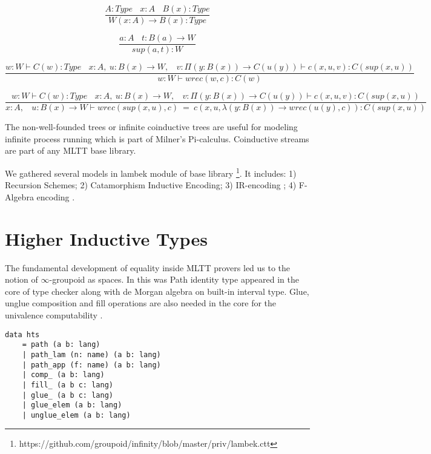\documentclass{aip-cp}
\begin{document}
\begin{equation}
\tag{$W$-formation}
\dfrac
{A:Type\ \ \ \ x:A\ \ \ \ B(x):Type}
{W (x:A) \rightarrow B(x) : Type}
\end{equation}

\begin{equation}
\tag{$W$-intro}
\dfrac
{a:A\ \ \ \ t: B(a) \rightarrow W}
{sup(a,t) : W}
\end{equation}

\begin{equation}
\tag{$W$-elimination}
\dfrac
{w: W \vdash C(w) : Type\ \ \ \ x:A,\ u:B(x) \rightarrow W,\ \ \ \ v:\Pi (y:B(x)) \rightarrow C(u(y)) \vdash c(x,u,v):C(sup(x,u))}
{w:W \vdash wrec(w,c):C(w)}
\end{equation}

\begin{equation}
\tag{$W$-computation}
\dfrac
{w: W \vdash C(w) : Type\ \ \ \ x:A,\ u:B(x) \rightarrow W,\ \ \ \ v:\Pi (y:B(x)) \rightarrow C(u(y)) \vdash c(x,u,v):C(sup(x,u))}
{x:A,\ \ \ \ u:B(x) \rightarrow W \vdash wrec(sup(x,u),c)\ =\ c(x,u,\lambda (y:B(x)) \rightarrow wrec(u(y),c)):C(sup(x,u))}
\end{equation}

The non-well-founded trees or infinite coinductive trees \cite{Jacobs97,Basold16}
are useful for modeling infinite process running which is
part of Milner's Pi-calculus. Coinductive streams are
part of any MLTT base library.

We gathered several models in lambek module of base library \footnote{https://github.com/groupoid/infinity/blob/master/priv/lambek.ctt}.
It includes:
1) Recursion Schemes;
2) Catamorphism Inductive Encoding;
3) IR-encoding \cite{Dagand13};
4) F-Algebra encoding  \cite{Hinze13}.

\section{Higher Inductive Types}

The fundamental development of equality inside MLTT
provers led us to the notion of $\infty$-groupoid \cite{Streicher95} as spaces.
In this was Path identity type appeared in the core
of type checker along with de Morgan algebra on
built-in interval type. Glue, unglue composition
and fill operations are also needed in the core
for the univalence computability \cite{Mortberg17}.

\begin{lstlisting}[mathescape=true]
data hts
    = path (a b: lang)
    | path_lam (n: name) (a b: lang)
    | path_app (f: name) (a b: lang)
    | comp_ (a b: lang)
    | fill_ (a b c: lang)
    | glue_ (a b c: lang)
    | glue_elem (a b: lang)
    | unglue_elem (a b: lang)
\end{lstlisting}
\end{document}
